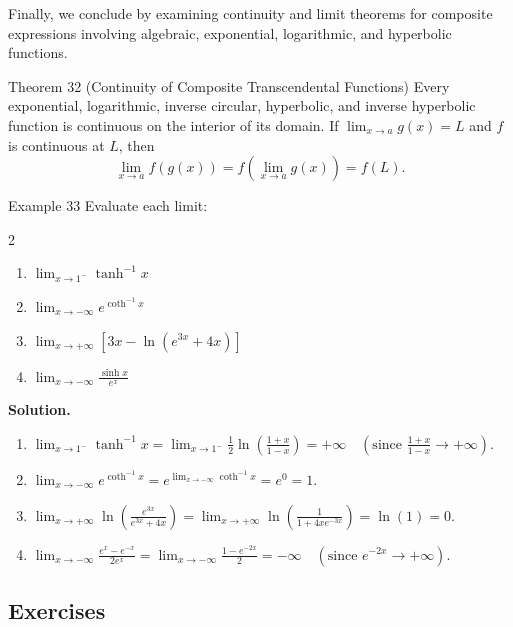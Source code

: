 Finally, we conclude by examining continuity and limit theorems for composite expressions involving algebraic, exponential, logarithmic, and hyperbolic functions.

\begin{theorembox}{Theorem 32 (Continuity of Composite Transcendental Functions)}
Every exponential, logarithmic, inverse circular, hyperbolic, and inverse hyperbolic function is continuous on the interior of its domain.
If \(\displaystyle\lim_{x \to a} g(x) = L\) and \(f\) is continuous at \(L\), then
\[
\lim_{x \to a} f(g(x)) = f\!\left(\lim_{x \to a} g(x)\right) = f(L).
\]
\end{theorembox}

\begin{examplebox}{Example 33}
Evaluate each limit:
\begin{multicols}{2}
\begin{enumerate}
    \item \(\displaystyle\lim_{x \to 1^-} \tanh^{-1} x\)
    \item \(\displaystyle\lim_{x \to -\infty} e^{\coth^{-1} x}\)
    \item \(\displaystyle\lim_{x \to +\infty} \left[ 3x - \ln(e^{3x} + 4x) \right]\)
    \item \(\displaystyle\lim_{x \to -\infty} \frac{\sinh x}{e^x}\)
\end{enumerate}
\end{multicols}

\medskip
\textbf{Solution.}
\begin{enumerate}
    \item \(\displaystyle\lim_{x \to 1^-} \tanh^{-1} x = \lim_{x \to 1^-} \frac{1}{2}\ln\!\left(\frac{1+x}{1-x}\right) = +\infty \quad \left(\text{since } \frac{1+x}{1-x} \to +\infty\right)\).
    \item \(\displaystyle\lim_{x \to -\infty} e^{\coth^{-1} x} = e^{\lim_{x \to -\infty} \coth^{-1} x} = e^0 = 1\).
    \item \(\displaystyle\lim_{x \to +\infty} \ln\!\left(\frac{e^{3x}}{e^{3x} + 4x}\right) = \lim_{x \to +\infty} \ln\!\left(\frac{1}{1 + 4xe^{-3x}}\right) = \ln(1) = 0\).
    \item \(\displaystyle\lim_{x \to -\infty} \frac{e^x - e^{-x}}{2e^x} = \lim_{x \to -\infty} \frac{1 - e^{-2x}}{2} = -\infty \quad (\text{since } e^{-2x} \to +\infty)\).
\end{enumerate}
\end{examplebox}

\subsection*{Exercises}
\label{subsec:1.7.7}

